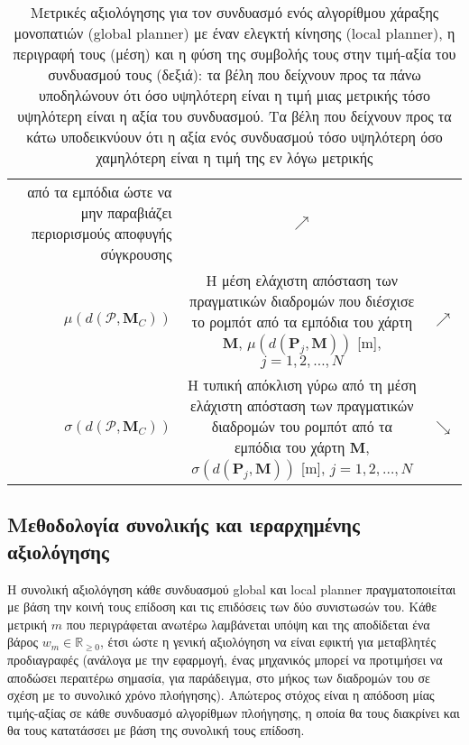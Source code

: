 \begin{table}
\begin{tabular}{rcc}
\begin{minipage}[t]{0.7\columnwidth}
      από τα εμπόδια ώστε να μην παραβιάζει περιορισμούς αποφυγής σύγκρουσης
      \end{minipage} & $\nearrow$ \\
    $\mu(d(\bm{\mathcal{P}},\bm{M}_C))$ &
    \begin{minipage}[t]{0.7\columnwidth}%
      Η μέση ελάχιστη απόσταση των πραγματικών διαδρομών που διέσχισε το
      ρομπότ από τα εμπόδια του χάρτη $\bm{M}$, $\mu(d(\bm{P}_j, \bm{M}))$ [m],
      $j = 1,2,\dots,N$
      \end{minipage} & $\nearrow$ \\
    $\sigma(d(\bm{\mathcal{P}},\bm{M}_C))$ &
    \begin{minipage}[t]{0.7\columnwidth}%
      Η τυπική απόκλιση γύρω από τη μέση ελάχιστη απόσταση των πραγματικών
      διαδρομών του ρομπότ από τα εμπόδια του χάρτη $\bm{M}$,
      $\sigma(d(\bm{P}_j, \bm{M}))$ [m], $j = 1,2,\dots,N$
      \end{minipage} & $\searrow$ \\ \bottomrule
  \end{tabular}
  \caption{\small Μετρικές αξιολόγησης για τον συνδυασμό ενός αλγορίθμου
           χάραξης μονοπατιών (global planner) με έναν ελεγκτή κίνησης
           (local planner), η περιγραφή τους (μέση) και η φύση της συμβολής
           τους στην τιμή-αξία του συνδυασμού τους (δεξιά): τα βέλη που δείχνουν
           προς τα πάνω υποδηλώνουν ότι όσο υψηλότερη είναι η τιμή μιας
           μετρικής τόσο υψηλότερη είναι η αξία του συνδυασμού. Τα βέλη που
           δείχνουν προς τα κάτω υποδεικνύουν ότι η αξία ενός συνδυασμού τόσο
           υψηλότερη όσο χαμηλότερη είναι η τιμή της εν λόγω μετρικής}
  \label{tbl:metrics_and_proportionality_combination_planners}
\end{table}



\subsection{Μεθοδολογία συνολικής και ιεραρχημένης αξιολόγησης}
\label{subsection:02_01_03:03}

Η συνολική αξιολόγηση κάθε συνδυασμού global και local planner πραγματοποιείται
με βάση την κοινή τους επίδοση και τις επιδόσεις των δύο συνιστωσών του. Κάθε
μετρική $m$ που περιγράφεται ανωτέρω λαμβάνεται υπόψη και της αποδίδεται ένα
βάρος $w_m \in \mathbb{R}_{\ge 0}$, έτσι ώστε η γενική αξιολόγηση να είναι
εφικτή για μεταβλητές προδιαγραφές (ανάλογα με την εφαρμογή, ένας μηχανικός
μπορεί να προτιμήσει να αποδώσει περαιτέρω σημασία, για παράδειγμα, στο μήκος
των διαδρομών του σε σχέση με το συνολικό χρόνο πλοήγησης). Απώτερος στόχος
είναι η απόδοση μίας τιμής-αξίας σε κάθε συνδυασμό αλγορίθμων πλοήγησης, η
οποία θα τους διακρίνει και θα τους κατατάσσει με βάση της συνολική τους
επίδοση.

